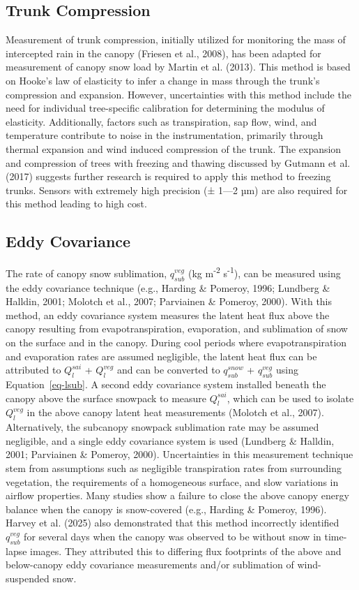 \documentclass[
  letterpaper,
]{tex/uofsthesis-cs}
\begin{document}
\subsection{Trunk Compression}\label{trunk-compression}

Measurement of trunk compression, initially utilized for monitoring the
mass of intercepted rain in the canopy (Friesen et al., 2008), has been
adapted for measurement of canopy snow load by Martin et al. (2013).
This method is based on Hooke's law of elasticity to infer a change in
mass through the trunk's compression and expansion. However,
uncertainties with this method include the need for individual
tree-specific calibration for determining the modulus of elasticity.
Additionally, factors such as transpiration, sap flow, wind, and
temperature contribute to noise in the instrumentation, primarily
through thermal expansion and wind induced compression of the trunk. The
expansion and compression of trees with freezing and thawing discussed
by Gutmann et al. (2017) suggests further research is required to apply
this method to freezing trunks. Sensors with extremely high precision (±
1---2 µm) are also required for this method leading to high cost.

\subsection{Eddy Covariance}\label{eddy-covariance}

The rate of canopy snow sublimation, \(q_{sub}^{veg}\) (kg
m\textsuperscript{-2} s\textsuperscript{-1}), can be measured using the
eddy covariance technique (e.g., Harding \& Pomeroy, 1996; Lundberg \&
Halldin, 2001; Molotch et al., 2007; Parviainen \& Pomeroy, 2000). With
this method, an eddy covariance system measures the latent heat flux
above the canopy resulting from evapotranspiration, evaporation, and
sublimation of snow on the surface and in the canopy. During cool
periods where evapotranspiration and evaporation rates are assumed
negligible, the latent heat flux can be attributed to \(Q_l^{sai}\) +
\(Q_l^{veg}\) and can be converted to \(q_{sub}^{snow}\) +
\(q_{sub}^{veg}\) using Equation~\ref{eq-lsub}. A second eddy covariance
system installed beneath the canopy above the surface snowpack to
measure \(Q_l^{sai}\), which can be used to isolate \(Q_l^{veg}\) in the
above canopy latent heat measurements (Molotch et al., 2007).
Alternatively, the subcanopy snowpack sublimation rate may be assumed
negligible, and a single eddy covariance system is used (Lundberg \&
Halldin, 2001; Parviainen \& Pomeroy, 2000). Uncertainties in this
measurement technique stem from assumptions such as negligible
transpiration rates from surrounding vegetation, the requirements of a
homogeneous surface, and slow variations in airflow properties. Many
studies show a failure to close the above canopy energy balance when the
canopy is snow-covered (e.g., Harding \& Pomeroy, 1996). Harvey et al.
(2025) also demonstrated that this method incorrectly identified
\(q_{sub}^{veg}\) for several days when the canopy was observed to be
without snow in time-lapse images. They attributed this to differing
flux footprints of the above and below-canopy eddy covariance
measurements and/or sublimation of wind-suspended snow.
\end{document}
